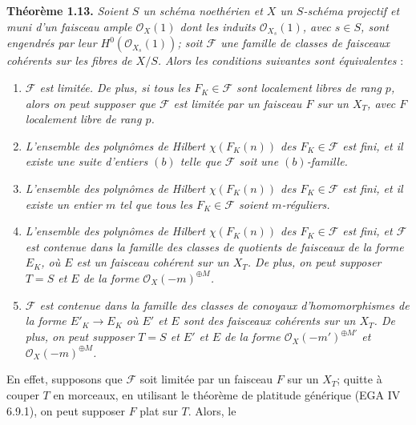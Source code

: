\textbf{Théorème 1.13.}
\emph{Soient \(S\) un schéma noethérien et \(X\) un \(S\)-schéma projectif et muni d'un faisceau ample \(\mathcal O_X(1)\) dont les induits \(\mathcal O_{X_s}(1)\), avec \(s\in S\), sont engendrés par leur \(H^0(\mathcal O_{X_s}(1))\); soit \(\mathcal F\) une famille de classes de faisceaux cohérents sur les fibres de \(X/S\). Alors les conditions suivantes sont équivalentes} :
\begin{enumerate}[label=(\roman*)]
\item \emph{\(\mathcal F\) est limitée. De plus, si tous les \(F_K\in\mathcal F\) sont localement libres de rang \(p\), alors on peut supposer que \(\mathcal F\) est limitée par un faisceau \(F\) sur un \(X_T\), avec \(F\) localement libre de rang \(p\).}
\item \emph{L'ensemble des polynômes de Hilbert \(\chi(F_K(n))\) des \(F_K\in\mathcal F\) est fini, et il existe une suite d'entiers \((b)\) telle que \(\mathcal F\) soit une \((b)\)-famille.}
\item \emph{L'ensemble des polynômes de Hilbert \(\chi(F_K(n))\) des \(F_K\in\mathcal F\) est fini, et il existe un entier \(m\) tel que tous les \(F_K\in\mathcal F\) soient \(m\)-réguliers.}
\item \emph{L'ensemble des polynômes de Hilbert \(\chi(F_K(n))\) des \(F_K\in\mathcal F\) est fini, et \(\mathcal F\) est contenue dans la famille des classes de quotients de faisceaux de la forme \(E_K\), où \(E\) est un faisceau cohérent sur un \(X_T\). De plus, on peut supposer \(T=S\) et \(E\) de la forme \(\mathcal O_X(-m)^{\oplus M}\).}
\item \emph{\(\mathcal F\) est contenue dans la famille des classes de conoyaux d'homomorphismes de la forme \(E'_K\to E_K\) où \(E'\) et \(E\) sont des faisceaux cohérents sur un \(X_T\). De plus, on peut supposer \(T=S\) et \(E'\) et \(E\) de la forme \(\mathcal O_X(-m')^{\oplus M'}\) et \(\mathcal O_X(-m)^{\oplus M}\).}
\end{enumerate}
En effet, supposons que \(\mathcal F\) soit limitée par un faisceau \(F\) sur un \(X_T\); quitte à couper \(T\) en morceaux, en utilisant le théorème de platitude générique (EGA IV 6.9.1), on peut supposer \(F\) plat sur \(T\). Alors, le
